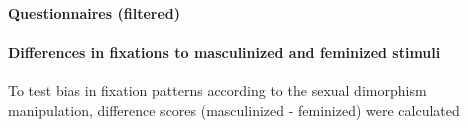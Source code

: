 \documentclass[
  bookmarksnumbered]{article}
\newenvironment{Shaded}{\begin{snugshade}}{\end{snugshade}}
\newcommand{\AttributeTok}[1]{\textcolor[rgb]{0.80,0.80,0.80}{#1}}
\newcommand{\FunctionTok}[1]{\textcolor[rgb]{0.94,0.94,0.56}{#1}}
\newcommand{\NormalTok}[1]{\textcolor[rgb]{0.80,0.80,0.80}{#1}}
\newcommand{\OtherTok}[1]{\textcolor[rgb]{0.94,0.94,0.56}{#1}}
\newcommand{\SpecialCharTok}[1]{\textcolor[rgb]{0.86,0.64,0.64}{#1}}
\newcommand{\StringTok}[1]{\textcolor[rgb]{0.80,0.58,0.58}{#1}}
\begin{document}
\begin{Shaded}
\end{Shaded}

\paragraph{Questionnaires (filtered)}\label{questionnaires-filtered}

\begin{Shaded}
\end{Shaded}

\paragraph{Differences in fixations to masculinized and feminized stimuli}\label{differences-in-fixations-to-masculinized-and-feminized-stimuli}

To test bias in fixation patterns according to the sexual dimorphism manipulation, difference scores (masculinized - feminized) were calculated
\end{document}
